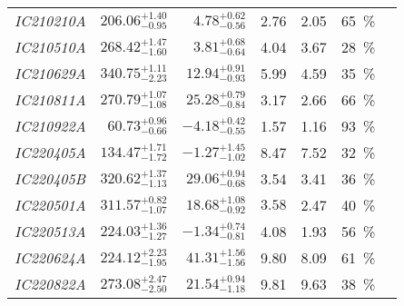 \begin{table*}
\begin{tabular}{l r r r r c c}
        \emph{IC210210A} & $206.06^{+1.40}_{-0.95}$ & $4.78^{+0.62}_{-0.56}$   & 2.76                 & 2.05                 & \SI{65}{\percent}  & \cite{IC210210A1, IC210210A2}                         \\
        \emph{IC210510A} & $268.42^{+1.47}_{-1.60}$ & $3.81^{+0.68}_{-0.64}$   & 4.04                 & 3.67                 & \SI{28}{\percent}  & \cite{IC210510A1, IC210510A2}                         \\
        \emph{IC210629A} & $340.75^{+1.11}_{-2.23}$ & $12.94^{+0.91}_{-0.93}$  & 5.99                 & 4.59                 & \SI{35}{\percent}  & \cite{IC210629A1, IC210629A2, IC210629A3}             \\
        \emph{IC210811A} & $270.79^{+1.07}_{-1.08}$ & $25.28^{+0.79}_{-0.84}$  & 3.17                 & 2.66                 & \SI{66}{\percent}  & \cite{IC210811A1, IC210811A2}                         \\
        \emph{IC210922A} & $60.73^{+0.96}_{-0.66}$  & $-4.18^{+0.42}_{-0.55}$  & 1.57                 & 1.16                 & \SI{93}{\percent}  & \cite{IC210922A1, IC210922A2}                         \\
        \emph{IC220405A} & $134.47^{+1.71}_{-1.72}$ & $-1.27^{+1.45}_{-1.02}$  & 8.47                 & 7.52                 & \SI{32}{\percent}  & \cite{IC220405A1, IC220405A2}                         \\
        \emph{IC220405B} & $320.62^{+1.37}_{-1.13}$ & $29.06^{+0.94}_{-0.68}$  & 3.54                 & 3.41                 & \SI{36}{\percent}  & \cite{IC220405B1, IC220405A2}                         \\
        \emph{IC220501A} & $311.57^{+0.82}_{-1.07}$ & $18.68^{+1.08}_{-0.92}$  & $3.58$               & 2.47                 & \SI{40}{\percent}  & \cite{IC220501A1, IC220501A2}                         \\
        \emph{IC220513A} & $224.03^{+1.36}_{-1.27}$ & $-1.34^{+0.74}_{-0.81}$  & 4.08                 & 1.93                 & \SI{56}{\percent}  & \cite{IC220513A1, IC220513A2}                         \\
        \emph{IC220624A} & $224.12^{+2.23}_{-1.95}$ & $41.31^{+1.56}_{-1.56}$  & 9.80                 & 8.09                 & \SI{61}{\percent}  & \cite{IC220624A1, IC220624A2}                         \\
        \emph{IC220822A} & $273.08^{+2.47}_{-2.50}$ & $21.54^{+0.94}_{-1.18}$  & 9.81                 & 9.63                 & \SI{38}{\percent}  & \cite{IC220822A1, IC220822A2}                         \\

\end{tabular}
\end{table*}
